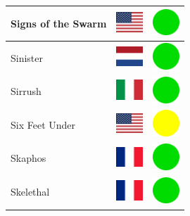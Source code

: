 \documentclass[12pt, a4paper, twoside]{report}
\begin{document}
\begin{center}
\begin{longtable}{|p{5cm}|p{2cm}|p{2cm}|}
 Signs of the Swarm                                         & \includegraphics[width=1cm]{../img/flags/us} &   \includegraphics[width=1cm]{../likes/y} \\ \hline
 Sinister                                                   & \includegraphics[width=1cm]{../img/flags/nl} &   \includegraphics[width=1cm]{../likes/y} \\ \hline
 Sirrush                                                    & \includegraphics[width=1cm]{../img/flags/it} &   \includegraphics[width=1cm]{../likes/y} \\ \hline
 Six Feet Under                                             & \includegraphics[width=1cm]{../img/flags/us} &   \includegraphics[width=1cm]{../likes/m} \\ \hline
 Skaphos                                                    & \includegraphics[width=1cm]{../img/flags/fr} &   \includegraphics[width=1cm]{../likes/y} \\ \hline
 Skelethal                                                  & \includegraphics[width=1cm]{../img/flags/fr} &   \includegraphics[width=1cm]{../likes/y} \\ \hline

\end{longtable}
\end{center}
\end{document}
